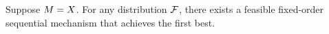 \begin{theorem}\label{thm: optimal max qualified cheap talk}
Suppose $M=X$. 
    For any distribution $\mathcal{F}$, there exists a feasible fixed-order sequential mechanism that achieves the first best.
\end{theorem}






